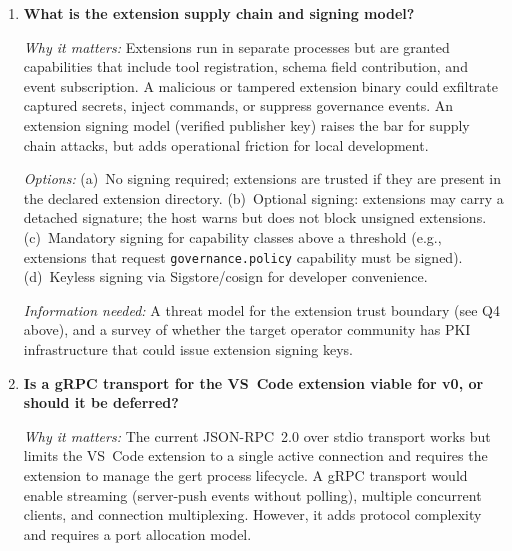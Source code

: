 \begin{enumerate}[label=\textbf{Q\arabic*.}]
    \textit{Options:} (a)~Hard break: define a new JSON-RPC method set; the VS~Code extension is
    updated as part of the launch. (b)~Versioned negotiation: the \texttt{initialize} handshake
    includes a protocol version field; the host advertises capabilities and the client selects a
    compatible version. (c)~No change: the current JSON-RPC surface is preserved unchanged.

    \textit{Information needed:} A complete method inventory of the JSON-RPC API surface (all
    methods and notification shapes currently used by the VS~Code extension), and a determination of
    which methods require changes to expose new features (e.g., saga events, OTel trace IDs).

  \item \textbf{What is the extension supply chain and signing model?}

    \textit{Why it matters:} Extensions run in separate processes but are granted capabilities that
    include tool registration, schema field contribution, and event subscription. A malicious or
    tampered extension binary could exfiltrate captured secrets, inject commands, or suppress
    governance events. An extension signing model (verified publisher key) raises the bar for supply
    chain attacks, but adds operational friction for local development.

    \textit{Options:} (a)~No signing required; extensions are trusted if they are present in the
    declared extension directory. (b)~Optional signing: extensions may carry a detached signature;
    the host warns but does not block unsigned extensions. (c)~Mandatory signing for capability
    classes above a threshold (e.g., extensions that request \texttt{governance.policy} capability
    must be signed). (d)~Keyless signing via Sigstore/cosign for developer convenience.

    \textit{Information needed:} A threat model for the extension trust boundary (see Q4 above), and
    a survey of whether the target operator community has PKI infrastructure that could issue extension
    signing keys.

  \item \textbf{Is a gRPC transport for the VS~Code extension viable for v0, or should it be deferred?}

    \textit{Why it matters:} The current JSON-RPC~2.0 over stdio transport works but limits the
    VS~Code extension to a single active connection and requires the extension to manage the gert
    process lifecycle. A gRPC transport would enable streaming (server-push events without polling),
    multiple concurrent clients, and connection multiplexing. However, it adds protocol complexity
    and requires a port allocation model.


\end{enumerate}
